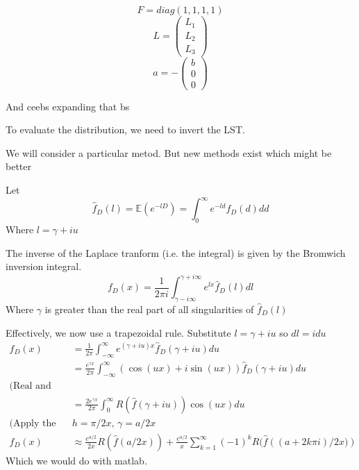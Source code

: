 \documentclass{X:/Documents/Coding/Latex/myassignment}
\begin{document}
\[F=diag(1,1,1,1)\]
\[L = \begin{pmatrix}
    L_1\\L_2\\L_3
\end{pmatrix}\]
\[a = - \begin{pmatrix}
    b\\0\\0
\end{pmatrix}\]


And ceebs expanding that bs




To evaluate the distribution, we need to invert the LST.

We will consider a particular metod. But new methods exist which might be better




Let
\[\hat{f}_D (l) = \mathbb{E}\left(e^{-lD}\right) = \int_0^\infty e^{-ld} f_D(d) dd\]
Where $l = \gamma + iu$

The inverse of the Laplace tranform (i.e. the integral) is given by the Bromwich inversion integral.
\[f_D(x) = \frac{1}{2\pi i} \int_{\gamma - i\infty}^{\gamma +i\infty} e^{lx} \hat{f}_D (l) dl\]
Where $\gamma$ is greater than the real part of all singularities of $\hat{f}_D(l)$

Effectively, we now use a trapezoidal rule.
Substitute $l = \gamma + iu$ so $dl = idu$
\begin{align*}
f_D(x) &= \frac{1}{2\pi} \int_{-\infty}^\infty e^{(\gamma + iu)x} \hat{f}_D(\gamma+iu) du\\
&= \frac{e^{\gamma x}}{2\pi} \int_{-\infty}^\infty (\cos(ux) + i\sin(ux)) \hat{f}_D(\gamma + iu) du\\
\text{(Real and nonnegative)}&\\
&=\frac{2e^{\gamma x}}{2\pi} \int_0^\infty R(\hat{f}(\gamma+iu)) \cos(ux) du\\
\text{(Apply the trapezoidal rule w step size )}&h = \pi/2x, \, \gamma = a/2x\\
f_D(x) &\approx \frac{e^{a/2}}{2x} R(\hat{f}(a/2x)) + \frac{e^{a/2}}{x} \sum_{k=1}^\infty (-1)^k R(\hat{f}\left((a+2k\pi i)/2x)\right)
\end{align*}
Which we would do with matlab.
\end{document}
